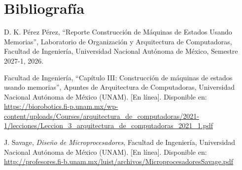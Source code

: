 \newpage
\section{Bibliografía}


\begin{biblio}
	\hypertarget{1-diana-karen}{}
	\item D. K. Pérez Pérez, ``Reporte Construcción de Máquinas de Estados Usando Memorias'', Laboratorio de Organización y Arquitectura de Computadoras, Facultad de Ingeniería, Universidad Nacional Autónoma de México, Semestre 2027-1, 2026.
	\hypertarget{2-facultad-ingenieria}{}
	\item Facultad de Ingeniería, ``Capítulo III: Construcción de máquinas de estados usando memorias'', Apuntes de Arquitectura de Computadoras, Universidad Nacional Autónoma de México (UNAM). [En línea]. Disponible en: \url{https://biorobotics.fi-p.unam.mx/wp-content/uploads/Courses/arquitectura_de_computadoras/2021-1/lecciones/Leccion_3_arquitectura_de_computadoras_2021_1.pdf}
	\item J. Savage, \textit{Diseño de Microprocesadores}, Facultad de Ingeniería, Universidad Nacional Autónoma de México (UNAM). [En línea]. Disponible en: \url{http://profesores.fi-b.unam.mx/luist/archivos/MicroprocesadoresSavage.pdf}
\end{biblio}